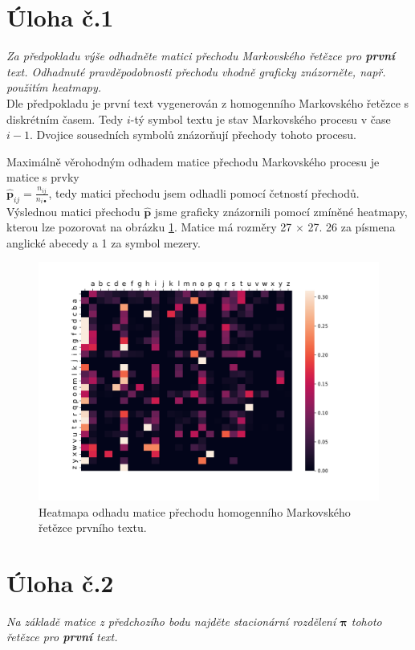 \documentclass[czech]{mvi-report}
\begin{document}
\section{Úloha č.1}
\textit{Za předpokladu výše odhadněte matici přechodu Markovského řetězce pro \textbf{první} text. Odhadnuté pravděpodobnosti přechodu vhodně graficky znázorněte, např. použitím heatmapy.}\\

Dle předpokladu je první text vygenerován z homogenního Markovského řetězce s diskrétním časem. Tedy $ i $-tý symbol textu je stav Markovského procesu v čase $ i - 1 $. Dvojice sousedních symbolů znázorňují přechody tohoto procesu.

Maximálně věrohodným odhadem matice přechodu Markovského procesu je matice s prvky \\ $ {\hat{\textbf{p}}_{ij} =\frac{n_{ij}}{n_{i\bullet}}} $, tedy matici přechodu jsem odhadli pomocí četností přechodů. Výslednou matici přechodu $ \hat{\textbf{p}} $ jsme graficky znázornili pomocí zmíněné heatmapy, kterou lze pozorovat na obrázku \ref{fig:heat}. Matice má rozměry 27 $ \times $ 27. 26 za písmena anglické abecedy a 1 za symbol mezery.

\begin{figure}[!ht]
\includegraphics[width=\textwidth]{img/heatmapp.png}
\caption{Heatmapa odhadu matice přechodu homogenního Markovského řetězce prvního textu.}
\label{fig:heat} 
\end{figure}

\section{Úloha č.2}
\textit{Na základě matice z předchozího bodu najděte stacionární rozdělení $ \bm{\pi} $ tohoto řetězce pro \textbf{první} text.}\\
\end{document}
